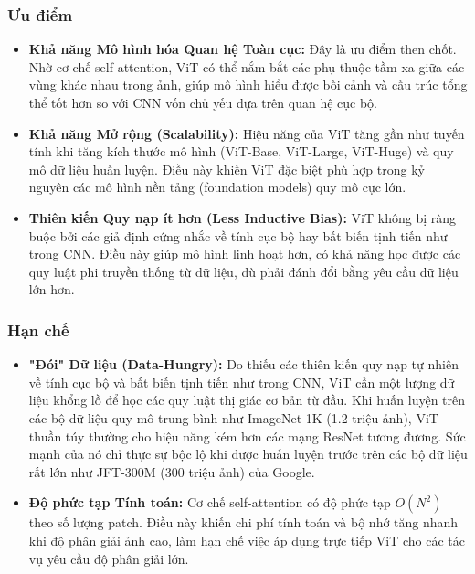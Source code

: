 \subsubsection{Ưu điểm}
\label{subsubsec:vit_advantages}
\begin{itemize}
	\item \textbf{Khả năng Mô hình hóa Quan hệ Toàn cục:} Đây là ưu điểm then chốt. Nhờ cơ chế self-attention, ViT có thể nắm bắt các phụ thuộc tầm xa giữa các vùng khác nhau trong ảnh, giúp mô hình hiểu được bối cảnh và cấu trúc tổng thể tốt hơn so với CNN vốn chủ yếu dựa trên quan hệ cục bộ.
	\item \textbf{Khả năng Mở rộng (Scalability):} Hiệu năng của ViT tăng gần như tuyến tính khi tăng kích thước mô hình (ViT-Base, ViT-Large, ViT-Huge) và quy mô dữ liệu huấn luyện. Điều này khiến ViT đặc biệt phù hợp trong kỷ nguyên các mô hình nền tảng (foundation models) quy mô cực lớn.
	\item \textbf{Thiên kiến Quy nạp ít hơn (Less Inductive Bias):} ViT không bị ràng buộc bởi các giả định cứng nhắc về tính cục bộ hay bất biến tịnh tiến như trong CNN. Điều này giúp mô hình linh hoạt hơn, có khả năng học được các quy luật phi truyền thống từ dữ liệu, dù phải đánh đổi bằng yêu cầu dữ liệu lớn hơn.
\end{itemize}

\subsubsection{Hạn chế}
\label{subsubsec:vit_disadvantages}
\begin{itemize}
	\item \textbf{"Đói" Dữ liệu (Data-Hungry):} Do thiếu các thiên kiến quy nạp tự nhiên về tính cục bộ và bất biến tịnh tiến như trong CNN, ViT cần một lượng dữ liệu khổng lồ để học các quy luật thị giác cơ bản từ đầu. Khi huấn luyện trên các bộ dữ liệu quy mô trung bình như ImageNet-1K (1.2 triệu ảnh), ViT thuần túy thường cho hiệu năng kém hơn các mạng ResNet tương đương. Sức mạnh của nó chỉ thực sự bộc lộ khi được huấn luyện trước trên các bộ dữ liệu rất lớn như JFT-300M (300 triệu ảnh) của Google.
	\item \textbf{Độ phức tạp Tính toán:} Cơ chế self-attention có độ phức tạp $O(N^2)$ theo số lượng patch. Điều này khiến chi phí tính toán và bộ nhớ tăng nhanh khi độ phân giải ảnh cao, làm hạn chế việc áp dụng trực tiếp ViT cho các tác vụ yêu cầu độ phân giải lớn.
\end{itemize}


